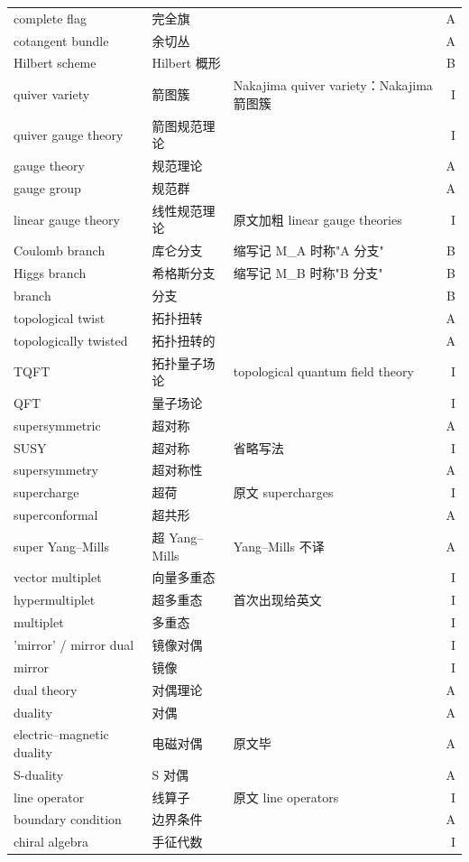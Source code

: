 \begin{longtable}{@{}>{\raggedright\arraybackslash}p{}>{\raggedright\arraybackslash}p{}>{\raggedright\arraybackslash}p{}@{\quad}r@{}}
complete flag & 完全旗 &  & A\\
cotangent bundle & 余切丛 &  & A\\
Hilbert scheme & Hilbert 概形 &  & B\\
quiver variety & 箭图簇 & Nakajima quiver variety：Nakajima 箭图簇 & I\\
quiver gauge theory & 箭图规范理论 &  & I\\
gauge theory & 规范理论 &  & A\\
gauge group & 规范群 &  & A\\
linear gauge theory & 线性规范理论 & 原文加粗 linear gauge theories & I\\
Coulomb branch & 库仑分支 & 缩写记 M\_A 时称"A 分支" & B\\
Higgs branch & 希格斯分支 & 缩写记 M\_B 时称"B 分支" & B\\
branch & 分支 &  & B\\
topological twist & 拓扑扭转 &  & A\\
topologically twisted & 拓扑扭转的 &  & A\\
TQFT & 拓扑量子场论 & topological quantum field theory & I\\
QFT & 量子场论 &  & I\\
supersymmetric & 超对称 &  & A\\
SUSY & 超对称 & 省略写法 & I\\
supersymmetry & 超对称性 &  & A\\
supercharge & 超荷 & 原文 supercharges & I\\
superconformal & 超共形 &  & A\\
super Yang–Mills & 超 Yang–Mills & Yang–Mills 不译 & A\\
vector multiplet & 向量多重态 &  & I\\
hypermultiplet & 超多重态 & 首次出现给英文 & I\\
multiplet & 多重态 &  & I\\
'mirror' / mirror dual & 镜像对偶 &  & I\\
mirror & 镜像 &  & I\\
dual theory & 对偶理论 &  & A\\
duality & 对偶 &  & A\\
electric–magnetic duality & 电磁对偶 & 原文毕 & A\\
S-duality & S 对偶 &  & A\\
line operator & 线算子 & 原文 line operators & I\\
boundary condition & 边界条件 &  & A\\
chiral algebra & 手征代数 &  & I\\

\end{longtable}
